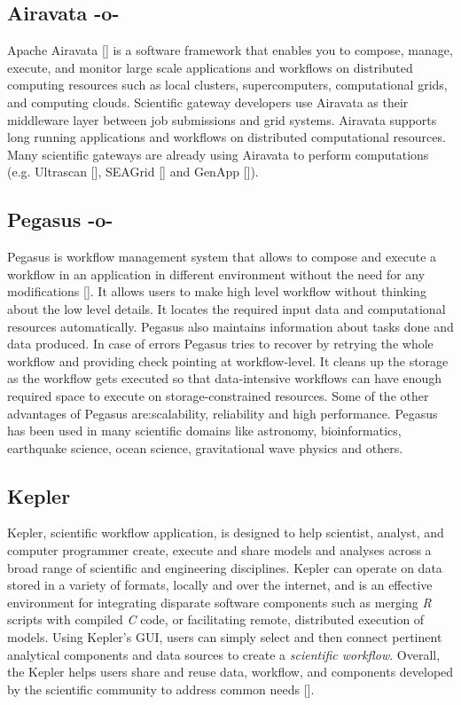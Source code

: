 \subsection{Airavata -o-}

Apache Airavata [\cite{www-airavata}] is a software framework that
enables you to compose, manage, execute, and monitor large scale
applications and workflows on distributed computing resources such as
local clusters, supercomputers, computational grids, and computing
clouds. Scientific gateway developers use Airavata as their middleware
layer between job submissions and grid systems. Airavata supports long
running applications and workflows on distributed computational
resources. Many scientific gateways are already using Airavata to
perform computations (e.g. Ultrascan [\cite{www-ultrascan}],
SEAGrid [\cite{www-seagrid}] and GenApp [\cite{www-genapp}]).



\subsection{Pegasus -o-}

Pegasus is workflow management system that allows to compose and
execute a workflow in an application in different environment without
the need for any modifications [\cite{www-Pegasus}]. It allows users to
make high level workflow without thinking about the low level
details. It locates the required input data and computational
resources automatically.  Pegasus also maintains information about
tasks done and data produced. In case of errors Pegasus tries to
recover by retrying the whole workflow and providing check pointing at
workflow-level.  It cleans up the storage as the workflow gets
executed so that data-intensive workflows can have enough required
space to execute on storage-constrained resources. Some of the other
advantages of Pegasus are:scalability, reliability and high
performance. Pegasus has been used in many scientific domains like
astronomy, bioinformatics, earthquake science, ocean science,
gravitational wave physics and others.




\subsection{Kepler}
 
Kepler, scientific workflow application, is designed to help
scientist, analyst, and computer programmer create, execute and share
models and analyses across a broad range of scientific and engineering
disciplines.  Kepler can operate on data stored in a variety of
formats, locally and over the internet, and is an effective
environment for integrating disparate software components such as
merging \textit{R} scripts with compiled \textit{C} code, or facilitating remote,
distributed execution of models. Using Kepler's GUI, users can simply
select and then connect pertinent analytical components and data
sources to create a \textit{scientific workflow}. Overall, the Kepler helps
users share and reuse data, workflow, and components developed by the
scientific community to address common needs [\cite{www-kepler}].

